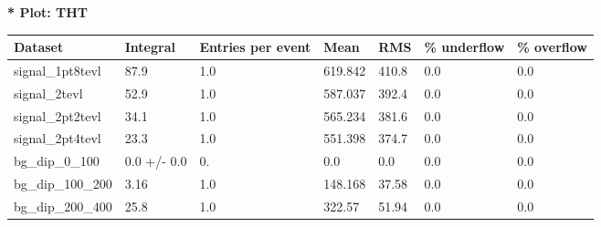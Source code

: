 \documentclass[a4paper, 10pt]{article}
\begin{document}
\textbf{* Plot: THT}\\
   \begin{table}[H]
  \begin{center}
    \begin{tabular}{|m{23.0mm}|m{23.0mm}|m{18.0mm}|m{19.0mm}|m{19.0mm}|m{19.0mm}|m{19.0mm}|}
      \hline
      {\cellcolor{yellow}         Dataset}& {\cellcolor{yellow}         Integral}& {\cellcolor{yellow}         Entries per event}& {\cellcolor{yellow}         Mean}& {\cellcolor{yellow}         RMS}& {\cellcolor{yellow}         \% underflow}& {\cellcolor{yellow}         \% overflow}\\
      \hline
      {\cellcolor{white}         signal\_1pt8tevl}& {\cellcolor{white}         87.9}& {\cellcolor{white}         1.0}& {\cellcolor{white}         619.842}& {\cellcolor{white}         410.8}& {\cellcolor{green}         0.0}& {\cellcolor{green}         0.0}\\
      \hline
      {\cellcolor{white}         signal\_2tevl}& {\cellcolor{white}         52.9}& {\cellcolor{white}         1.0}& {\cellcolor{white}         587.037}& {\cellcolor{white}         392.4}& {\cellcolor{green}         0.0}& {\cellcolor{green}         0.0}\\
      \hline
      {\cellcolor{white}         signal\_2pt2tevl}& {\cellcolor{white}         34.1}& {\cellcolor{white}         1.0}& {\cellcolor{white}         565.234}& {\cellcolor{white}         381.6}& {\cellcolor{green}         0.0}& {\cellcolor{green}         0.0}\\
      \hline
      {\cellcolor{white}         signal\_2pt4tevl}& {\cellcolor{white}         23.3}& {\cellcolor{white}         1.0}& {\cellcolor{white}         551.398}& {\cellcolor{white}         374.7}& {\cellcolor{green}         0.0}& {\cellcolor{green}         0.0}\\
      \hline
      {\cellcolor{white}         bg\_dip\_0\_100}& {\cellcolor{white}         0.0 +/\-- 0.0}& {\cellcolor{white}         0.}& {\cellcolor{white}         0.0}& {\cellcolor{white}         0.0}& {\cellcolor{green}         0.0}& {\cellcolor{green}         0.0}\\
      \hline
      {\cellcolor{white}         bg\_dip\_100\_200}& {\cellcolor{white}         3.16}& {\cellcolor{white}         1.0}& {\cellcolor{white}         148.168}& {\cellcolor{white}         37.58}& {\cellcolor{green}         0.0}& {\cellcolor{green}         0.0}\\
      \hline
      {\cellcolor{white}         bg\_dip\_200\_400}& {\cellcolor{white}         25.8}& {\cellcolor{white}         1.0}& {\cellcolor{white}         322.57}& {\cellcolor{white}         51.94}& {\cellcolor{green}         0.0}& {\cellcolor{green}         0.0}\\

\end{tabular}
\end{center}
\end{table}
\end{document}
